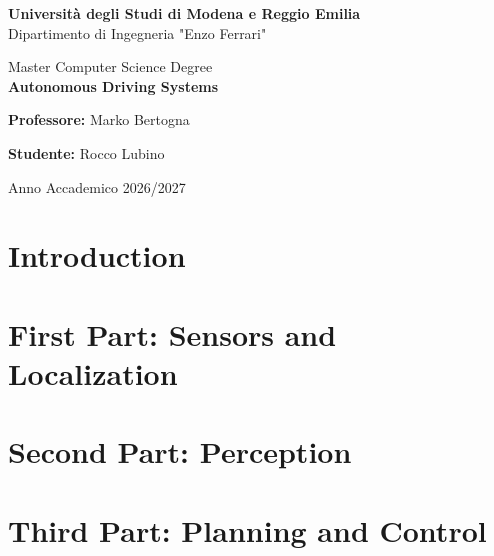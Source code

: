 \documentclass[11pt,a4paper,oneside,openany]{book}
\begin{document}
\begin{titlepage}
  \begin{center}
      {\Large \textbf{Università degli Studi di Modena e Reggio Emilia}} \\[2mm]
      {\large Dipartimento di Ingegneria "Enzo Ferrari"} \\[15mm]


      {\large Master Computer Science Degree} \\
      \vspace{0.5cm}
      {\huge \textbf{Autonomous Driving Systems}} \\


      \begin{flushleft}
          \textbf{Professore:} Marko Bertogna \\[5mm]
      \end{flushleft}

      \vspace{1.2cm}

      \begin{flushright}
          \textbf{Studente:} Rocco Lubino \\
      \end{flushright}

      \vspace{2cm}
      {\large Anno Accademico 2026/2027}
  \end{center}
\end{titlepage}
\restoregeometry

\tableofcontents
\clearpage

\chapter{Introduction}



\chapter{First Part: Sensors and Localization}





\chapter{Second Part: Perception}







\chapter{Third Part: Planning and Control}


\end{document}
